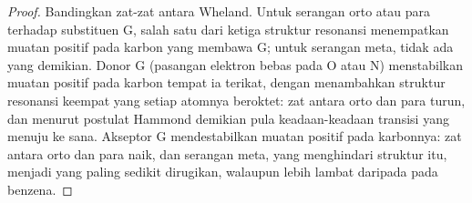 \begin{proof}
Bandingkan zat-zat antara Wheland. Untuk serangan orto atau para terhadap
substituen G, salah satu dari ketiga struktur resonansi menempatkan muatan
positif pada karbon yang membawa G; untuk serangan meta, tidak ada yang
demikian. Donor G (pasangan elektron bebas pada O atau N) menstabilkan
muatan positif pada karbon tempat ia terikat, dengan menambahkan struktur
resonansi keempat yang setiap atomnya beroktet: zat antara orto dan para
turun, dan menurut postulat Hammond demikian pula keadaan-keadaan transisi
yang menuju ke sana. Akseptor G mendestabilkan muatan positif pada
karbonnya: zat antara orto dan para naik, dan serangan meta, yang
menghindari struktur itu, menjadi yang paling sedikit dirugikan, walaupun
lebih lambat daripada pada benzena.
\end{proof}

